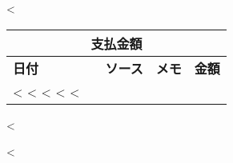 \begin{CJK}{UTF8}{arialuni}
\vspace{1.5cm}

<%
\begin{tabular}{@{}llllr@{}}
  \multicolumn{5}{c}{\textbf{支払金額}} \\
  \hline
  \textbf{日付} & & \textbf{ソース} & \textbf{メモ} & \textbf{金額} \\
<%
<%
  <%
<%
<%
\end{tabular}
<%

\vfill
<%
\end{CJK}

